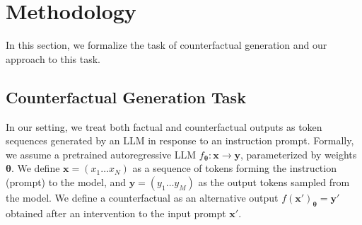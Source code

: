 \documentclass[letterpaper]{article} %
\newcommand{\al}[1]{\textcolor{blue}{\bf [Alex: #1]}}
\begin{document}


\section{Methodology}
In this section, we formalize the task of counterfactual generation and our approach to this task. 

\subsection{Counterfactual Generation Task}
In our setting, we treat both factual and counterfactual outputs as token sequences generated by an LLM in response to an instruction prompt. Formally, we assume a pretrained autoregressive LLM $f_{\mathbf{\theta}}: \mathbf{x} \rightarrow \mathbf{y}$, parameterized by weights $\mathbf{\theta}$. We define $\mathbf{x}={( x_1 \dots x_N)}$ as a sequence of tokens forming the instruction (prompt) to the model, and $\mathbf{y}={( y_1 \dots y_M)}$ as the output tokens sampled from the model. We define a counterfactual as an alternative output $f(\mathbf{x'})_{\mathbf{\theta}}=\mathbf{y}'$ obtained after an intervention to the input prompt $\mathbf{x}'$. 
\end{document}
